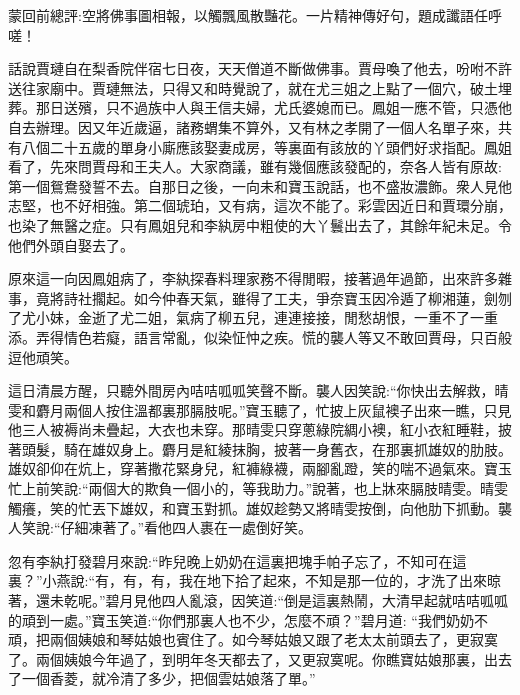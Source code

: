 

\begin{parag}
    \begin{note}蒙回前總評:空將佛事圖相報，以觸飄風散豔花。一片精神傳好句，題成讖語任呼嗟！\end{note}
\end{parag}


\begin{parag}
    話說賈璉自在梨香院伴宿七日夜，天天僧道不斷做佛事。賈母喚了他去，吩咐不許送往家廟中。賈璉無法，只得又和時覺說了，就在尤三姐之上點了一個穴，破土埋葬。那日送殯，只不過族中人與王信夫婦，尤氏婆媳而已。鳳姐一應不管，只憑他自去辦理。因又年近歲逼，諸務蝟集不算外，又有林之孝開了一個人名單子來，共有八個二十五歲的單身小廝應該娶妻成房，等裏面有該放的丫頭們好求指配。鳳姐看了，先來問賈母和王夫人。大家商議，雖有幾個應該發配的，奈各人皆有原故:第一個鴛鴦發誓不去。自那日之後，一向未和寶玉說話，也不盛妝濃飾。衆人見他志堅，也不好相強。第二個琥珀，又有病，這次不能了。彩雲因近日和賈環分崩，也染了無醫之症。只有鳳姐兒和李紈房中粗使的大丫鬟出去了，其餘年紀未足。令他們外頭自娶去了。
\end{parag}


\begin{parag}
    原來這一向因鳳姐病了，李紈探春料理家務不得閒暇，接著過年過節，出來許多雜事，竟將詩社擱起。如今仲春天氣，雖得了工夫，爭奈寶玉因冷遁了柳湘蓮，劍刎了尤小妹，金逝了尤二姐，氣病了柳五兒，連連接接，閒愁胡恨，一重不了一重添。弄得情色若癡，語言常亂，似染怔忡之疾。慌的襲人等又不敢回賈母，只百般逗他頑笑。
\end{parag}


\begin{parag}
    這日清晨方醒，只聽外間房內咭咭呱呱笑聲不斷。襲人因笑說:“你快出去解救，晴雯和麝月兩個人按住溫都裏那膈肢呢。”寶玉聽了，忙披上灰鼠襖子出來一瞧，只見他三人被褥尚未疊起，大衣也未穿。那晴雯只穿蔥綠院綢小襖，紅小衣紅睡鞋，披著頭髮，騎在雄奴身上。麝月是紅綾抹胸，披著一身舊衣，在那裏抓雄奴的肋肢。雄奴卻仰在炕上，穿著撒花緊身兒，紅褲綠襪，兩腳亂蹬，笑的喘不過氣來。寶玉忙上前笑說:“兩個大的欺負一個小的，等我助力。”說著，也上牀來膈肢晴雯。晴雯觸癢，笑的忙丟下雄奴，和寶玉對抓。雄奴趁勢又將晴雯按倒，向他肋下抓動。襲人笑說:“仔細凍著了。”看他四人裹在一處倒好笑。
\end{parag}


\begin{parag}
    忽有李紈打發碧月來說:“昨兒晚上奶奶在這裏把塊手帕子忘了，不知可在這裏？”小燕說:“有，有，有，我在地下拾了起來，不知是那一位的，才洗了出來晾著，還未乾呢。”碧月見他四人亂滾，因笑道:“倒是這裏熱鬧，大清早起就咭咭呱呱的頑到一處。”寶玉笑道:“你們那裏人也不少，怎麼不頑？”碧月道: “我們奶奶不頑，把兩個姨娘和琴姑娘也賓住了。如今琴姑娘又跟了老太太前頭去了，更寂寞了。兩個姨娘今年過了，到明年冬天都去了，又更寂寞呢。你瞧寶姑娘那裏，出去了一個香菱，就冷清了多少，把個雲姑娘落了單。”
\end{parag}


